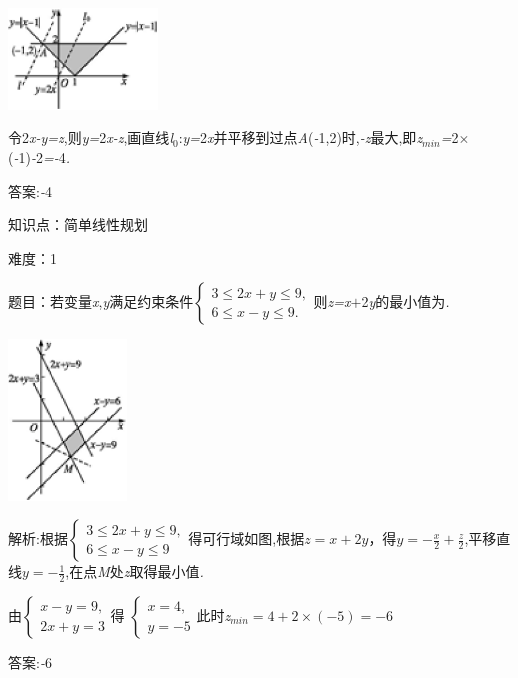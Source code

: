 \documentclass{article} %
\begin{document}
 \includegraphics*[width=1.56in, height=1.06in, keepaspectratio=false]{image1601}

令2\textit{x-y=z},则\textit{y=}2\textit{x-z},画直线\textit{l}${}_{0}$:\textit{y=}2\textit{x}并平移到过点\textit{A}(\textit{-}1,2)时,\textit{-z}最大,即\textit{z}${}_{min}$\textit{=}2\textit{$\times$}(\textit{-}1)\textit{-}2\textit{=-}4\textit{.}

 答案:\textit{-}4

知识点：简单线性规划

难度：1

 题目：若变量\textit{x},\textit{y}满足约束条件$
\begin{cases}
3 \le 2x +y \le 9,\\
6 \le x-y \le 9.
\end{cases}$则\textit{z=x$+$}2\textit{y}的最小值为\textit{\underbar{　　　　　}.~}

 \includegraphics*[width=1.24in, height=1.68in, keepaspectratio=false]{image1603}

 解析:根据$
\begin{cases}
3 \le 2x+y \le 9,\\
6\le x-y \le 9
\end{cases}$得可行域如图,根据$z=x+2y$，得$y=-\frac{x}{2}+\frac{z}{2}$,平移直线$y=-\frac{1}{2}$,在点\textit{M}处\textit{z}取得最小值\textit{.}

由$
\begin{cases}
x-y=9,\\
2x+y=3
\end{cases}$得
 $
\begin{cases}
x=4,\\
y=-5
\end{cases}$此时\textit{z}${}_{min}$$=4+2\times(-5)=-6$

 答案:\textit{-}6
\end{document}

